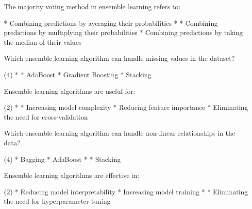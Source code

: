 \documentclass[11pt]{extarticle}
\begin{document}
\begin{exercise}
    The majority voting method in ensemble learning refers to:
    \begin{choice}
        * Combining predictions by averaging their probabilities
        * 
        * Combining predictions by multiplying their probabilities
        * Combining predictions by taking the median of their values
    \end{choice}
\end{exercise}
\begin{solution}
\end{solution}

\begin{exercise}
    Which ensemble learning algorithm can handle missing values in the dataset?
    \begin{choice} (4)
        * 
        * AdaBoost
        * Gradient Boosting
        * Stacking
    \end{choice}
\end{exercise}
\begin{solution}
\end{solution}

\begin{exercise}
    Ensemble learning algorithms are useful for:
    \begin{choice} (2)
        * 
        * Increasing model complexity
        * Reducing feature importance
        * Eliminating the need for cross-validation
    \end{choice}
\end{exercise}
\begin{solution}
\end{solution}

\begin{exercise}
    Which ensemble learning algorithm can handle non-linear relationships in the data?
    \begin{choice} (4)
        * Bagging
        * AdaBoost
        * 
        * Stacking
    \end{choice}
\end{exercise}
\begin{solution}
\end{solution}

\begin{exercise}
    Ensemble learning algorithms are effective in:
    \begin{choice} (2)
        * Reducing model interpretability
        * Increasing model training
        * 
        * Eliminating the need for hyperparameter tuning
    \end{choice}
\end{exercise}
\begin{solution}
\end{solution}
\end{document}
